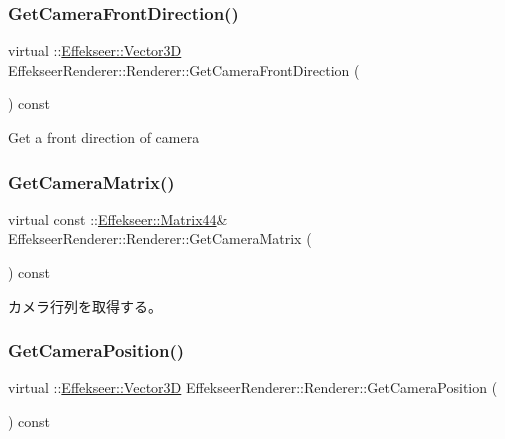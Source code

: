 \subsubsection{\texorpdfstring{Get\+Camera\+Front\+Direction()}{GetCameraFrontDirection()}}
{\footnotesize\ttfamily virtual \+::\mbox{\hyperlink{struct_effekseer_1_1_vector3_d}{Effekseer\+::\+Vector3D}} Effekseer\+Renderer\+::\+Renderer\+::\+Get\+Camera\+Front\+Direction (\begin{DoxyParamCaption}{ }\end{DoxyParamCaption}) const\hspace{0.3cm}{\ttfamily [pure virtual]}}



Get a front direction of camera 

\mbox{\label{class_effekseer_renderer_1_1_renderer_a9c386cbe84039115d2f7d224d8a9c41c}} 
\subsubsection{\texorpdfstring{Get\+Camera\+Matrix()}{GetCameraMatrix()}}
{\footnotesize\ttfamily virtual const \+::\mbox{\hyperlink{struct_effekseer_1_1_matrix44}{Effekseer\+::\+Matrix44}}\& Effekseer\+Renderer\+::\+Renderer\+::\+Get\+Camera\+Matrix (\begin{DoxyParamCaption}{ }\end{DoxyParamCaption}) const\hspace{0.3cm}{\ttfamily [pure virtual]}}



カメラ行列を取得する。 

\mbox{\label{class_effekseer_renderer_1_1_renderer_a904d639bb441e9221fd5421c1b75da71}} 
\subsubsection{\texorpdfstring{Get\+Camera\+Position()}{GetCameraPosition()}}
{\footnotesize\ttfamily virtual \+::\mbox{\hyperlink{struct_effekseer_1_1_vector3_d}{Effekseer\+::\+Vector3D}} Effekseer\+Renderer\+::\+Renderer\+::\+Get\+Camera\+Position (\begin{DoxyParamCaption}{ }\end{DoxyParamCaption}) const\hspace{0.3cm}{\ttfamily [pure virtual]}}



